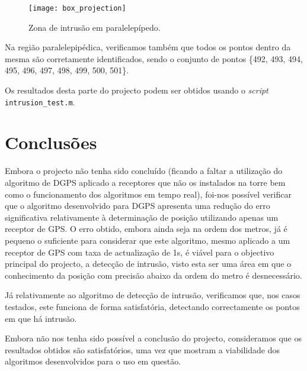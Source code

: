\documentclass{article}
\begin{document}
\newpage


\begin{figure}[!ht]
\centering
\texttt{[image: box\_projection]}
\caption{Zona de intrusão em paralelepípedo.}
\label{fig:erro_simples_UB1_box}
\end{figure}

Na região paralelepipédica, verificamos também que todos os pontos dentro da mesma são corretamente identificados, sendo o conjunto de pontos \{492, 493, 494, 495, 496, 497, 498, 499, 500, 501\}. 

Os resultados desta parte do projecto podem ser obtidos usando o \textit{script} \texttt{intrusion\_test.m}.

\newpage

\section{Conclusões}

Embora o projecto não tenha sido concluído (ficando a faltar a utilização do algoritmo de DGPS aplicado a receptores que não os instalados na torre bem como o funcionamento dos algoritmos em tempo real), foi-nos possível verificar que o algoritmo desenvolvido para DGPS apresenta uma redução do erro significativa relativamente à determinação de posição utilizando apenas um receptor de GPS. O erro obtido, embora ainda seja na ordem dos metros, já é pequeno o suficiente para considerar que este algoritmo, mesmo aplicado a um receptor de GPS com taxa de actualização de 1s, é viável para o objectivo principal do projecto, a detecção de intrusão, visto esta ser uma área em que o conhecimento da posição com precisão abaixo da ordem do metro é desnecessário.

Já relativamente ao algoritmo de detecção de intrusão, verificamos que, nos casos testados, este funciona de forma satisfatória, detectando correctamente os pontos em que há intrusão.

Embora não nos tenha sido possível a conclusão do projecto, consideramos que os resultados obtidos são satisfatórios, uma vez que mostram a viabilidade dos algoritmos desenvolvidos para o uso em questão.
\end{document}
